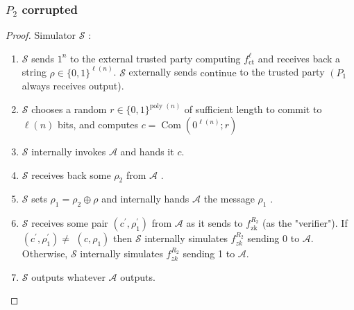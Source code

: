 \documentclass{beamer}
\begin{document}
    \begin{frame}
        \frametitle{$P_{2}$ corrupted}
        \begin{proof}
            Simulator $\mathcal{S}$ :
            \begin{enumerate}
                \item $\mathcal{S}$ sends $1^{n}$ to the external trusted party computing $f_{\mathrm{ct}}^{\ell}$ and receives back a string $\rho \in\{0,1\}^{\ell(n)}$. $\mathcal{S}$ externally sends $\mathrm{continue}$ to the trusted party $\left(P_{1}\right.$ always receives output).
                \item $\mathcal{S}$ chooses a random $r \in\{0,1\}^{\text {poly }(n)}$ of sufficient length to commit to $\ell(n)$ bits, and computes $c=\operatorname{Com}\left(0^{\ell(n)} ; r\right)$
                \item $\mathcal{S}$ internally invokes $\mathcal{A}$ and hands it $c$.
                \item $\mathcal{S}$ receives back some $\rho_{2}$ from $\mathcal{A}$ .
                \item $\mathcal{S}$ sets $\rho_{1}=\rho_{2} \oplus \rho$ and internally hands $\mathcal{A}$ the message $\rho_{1}$ .
                \item $\mathcal{S}$ receives some pair $\left(c^{\prime}, \rho_{1}^{\prime}\right)$ from $\mathcal{A}$ as it sends to $f_{\mathrm{zk}}^{R_{2}}$ (as the "verifier"). If $\left(c^{\prime}, \rho_{1}^{\prime}\right) \neq$ $\left(c, \rho_{1}\right)$ then $\mathcal{S}$ internally simulates $f_{z k}^{R_{2}}$ sending 0 to $\mathcal{A}$. Otherwise, $\mathcal{S}$ internally simulates $f_{z k}^{R_{2}}$ sending 1 to $\mathcal{A}$.
                \item $\mathcal{S}$ outputs whatever $\mathcal{A}$ outputs.
            \end{enumerate}
        \end{proof}
        
    
    \end{frame}
\end{document}
